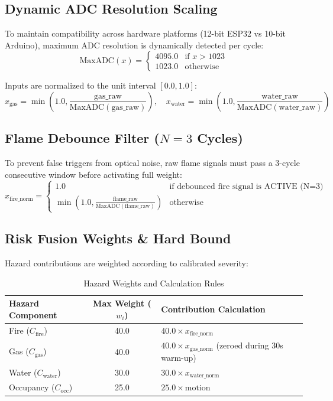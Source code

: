 \documentclass[11pt,a4paper]{article}
\begin{document}
\subsection{Dynamic ADC Resolution Scaling}
To maintain compatibility across hardware platforms (12-bit ESP32 vs 10-bit Arduino), maximum ADC resolution is dynamically detected per cycle:
\begin{equation}
\text{MaxADC}(x) = \begin{cases} 
4095.0 & \text{if } x > 1023 \\
1023.0 & \text{otherwise}
\end{cases}
\end{equation}

Inputs are normalized to the unit interval $[0.0, 1.0]$:
\begin{equation}
x_{\text{gas}} = \min\left(1.0, \frac{\text{gas\_raw}}{\text{MaxADC}(\text{gas\_raw})}\right), \quad x_{\text{water}} = \min\left(1.0, \frac{\text{water\_raw}}{\text{MaxADC}(\text{water\_raw})}\right)
\end{equation}

\subsection{Flame Debounce Filter ($N=3$ Cycles)}
To prevent false triggers from optical noise, raw flame signals must pass a 3-cycle consecutive window before activating full weight:
\begin{equation}
x_{\text{fire\_norm}} = \begin{cases}
1.0 & \text{if debounced fire signal is ACTIVE (N=3)} \\
\min\left(1.0, \frac{\text{flame\_raw}}{\text{MaxADC}(\text{flame\_raw})}\right) & \text{otherwise}
\end{cases}
\end{equation}

\subsection{Risk Fusion Weights \& Hard Bound}
Hazard contributions are weighted according to calibrated severity:
\begin{table}[H]
\centering
\begin{tabular}{l c l}
\toprule
\textbf{Hazard Component} & \textbf{Max Weight ($w_i$)} & \textbf{Contribution Calculation} \\
\midrule
Fire ($C_{\text{fire}}$) & 40.0 & $40.0 \times x_{\text{fire\_norm}}$ \\
Gas ($C_{\text{gas}}$) & 40.0 & $40.0 \times x_{\text{gas\_norm}}$ (zeroed during 30s warm-up) \\
Water ($C_{\text{water}}$) & 30.0 & $30.0 \times x_{\text{water\_norm}}$ \\
Occupancy ($C_{\text{occ}}$) & 25.0 & $25.0 \times \text{motion}$ \\
\bottomrule
\end{tabular}
\caption{Hazard Weights and Calculation Rules}
\end{table}
\end{document}
